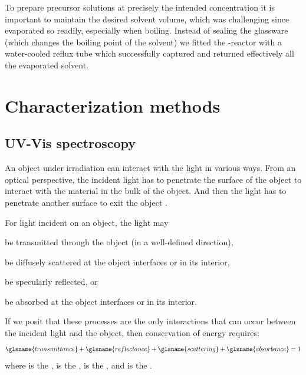 \documentclass[webedition,openright,titles,swedish,english]{LuaUUThesis}\usepackage[]{graphicx}\usepackage[]{xcolor}
\begin{document}
To prepare precursor solutions at precisely the intended concentration it is important to
maintain the desired solvent volume, which was challenging since  evaporated
so readily, especially when boiling.
Instead of sealing the glassware (which changes the boiling point of the solvent)
we fitted the -reactor with a water-cooled reflux tube which successfully captured
and returned effectively all the evaporated solvent.





\chapter{Characterization methods}%
\label{ch:characterization-methods}


\section{UV-Vis spectroscopy}
\label{methods:uvvis-spectroscopy}

An object under irradiation can interact with the light in various ways.
From an optical perspective, the incident light has to penetrate the surface of
the object to interact with the material in the bulk of the object. And then the
light has to penetrate another surface to exit the object \cite[p.\,71]{Stenzel2005}.

For light incident on an object, the light may
\begin{enumerate*}[label=(\alph*)]
\item be transmitted through the object (in a well-defined direction),
\item be diffusely scattered at the object interfaces or in its interior,
\item be specularly reflected, or
\item be absorbed at the object interfaces or in its interior.
\end{enumerate*}
If we posit that these processes are the only interactions that can occur
between the incident light and the object, then conservation of energy requires:
\begin{equation}\label{eq:TRSA=1}
\glsname{transmittance} + \glsname{reflectance} + \glsname{scattering} + \glsname{absorbance} = 1
\end{equation}
where  is the ,
 is the ,
 is the , and
 is the .
\end{document}
